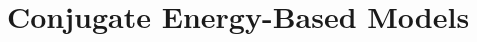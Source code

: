 \documentclass[tablecaption=bottom,wcp]{jmlr} %
\begin{document}
%
%



\section{Conjugate Energy-Based Models}
\label{sec:cebm}

\end{document}
